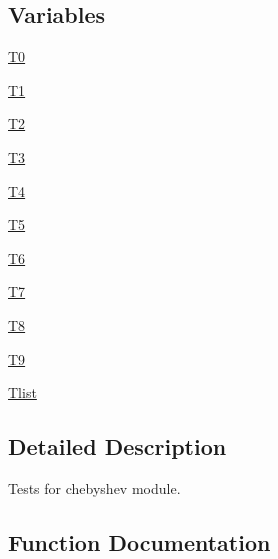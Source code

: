 \subsection*{Variables}
\begin{DoxyCompactItemize}
\item 
\hyperlink{namespacenumpy_1_1polynomial_1_1tests_1_1test__chebyshev_a157ad018c4479eff0a31125f4241eb5d}{T0}
\item 
\hyperlink{namespacenumpy_1_1polynomial_1_1tests_1_1test__chebyshev_a41010aeb29bd51dc9f1a5bca8a8c098f}{T1}
\item 
\hyperlink{namespacenumpy_1_1polynomial_1_1tests_1_1test__chebyshev_ab97065f0631d71957a6d23cd74272cb3}{T2}
\item 
\hyperlink{namespacenumpy_1_1polynomial_1_1tests_1_1test__chebyshev_a9f0813c31bba0956394f64449b632da4}{T3}
\item 
\hyperlink{namespacenumpy_1_1polynomial_1_1tests_1_1test__chebyshev_ae5efd33b1d6f16fc1f66716792c9c87c}{T4}
\item 
\hyperlink{namespacenumpy_1_1polynomial_1_1tests_1_1test__chebyshev_ac0d2288604ab06feca3212232f9e5559}{T5}
\item 
\hyperlink{namespacenumpy_1_1polynomial_1_1tests_1_1test__chebyshev_aba557dcaa359129ba965be54f4f30379}{T6}
\item 
\hyperlink{namespacenumpy_1_1polynomial_1_1tests_1_1test__chebyshev_a5713dc0716cc6bd48ef754c9ceb84c79}{T7}
\item 
\hyperlink{namespacenumpy_1_1polynomial_1_1tests_1_1test__chebyshev_af16c3bd98eac365780a8b1b2648601a8}{T8}
\item 
\hyperlink{namespacenumpy_1_1polynomial_1_1tests_1_1test__chebyshev_ad9e319030b4252a0affe2ffe94c7feb5}{T9}
\item 
\hyperlink{namespacenumpy_1_1polynomial_1_1tests_1_1test__chebyshev_abc8c7c65de8a6d6f7fc005db39ef3954}{Tlist}
\end{DoxyCompactItemize}


\subsection{Detailed Description}
\begin{DoxyVerb}Tests for chebyshev module.\end{DoxyVerb}
 

\subsection{Function Documentation}
\mbox{\label{namespacenumpy_1_1polynomial_1_1tests_1_1test__chebyshev_a05627da8658f27c85b81e9c812a2f521}} 
